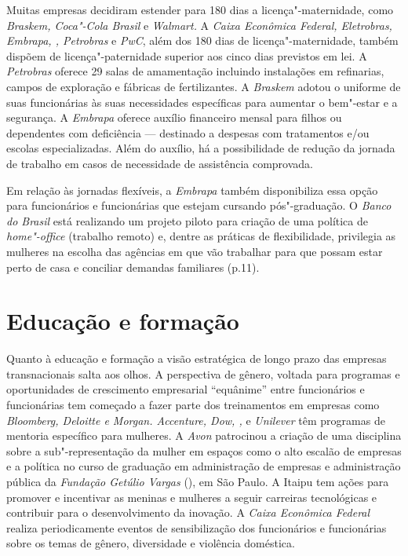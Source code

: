Muitas empresas decidiram estender para 180 dias a licença"-maternidade,
como \emph{Braskem, Coca"-Cola Brasil} e \emph{Walmart.} A \emph{Caixa
Econômica Federal, Eletrobras, Embrapa, , Petrobras} e \emph{PwC},
além dos 180 dias de licença"-maternidade, também dispõem de
licença"-paternidade superior aos cinco dias previstos em lei. A
\emph{Petrobras} oferece 29 salas de amamentação incluindo instalações
em refinarias, campos de exploração e fábricas de fertilizantes. A
\emph{Braskem} adotou o uniforme de suas funcionárias às suas
necessidades específicas para aumentar o bem"-estar e a segurança. A
\emph{Embrapa} oferece auxílio financeiro mensal para filhos ou
dependentes com deficiência --- destinado a despesas com tratamentos e/ou
escolas especializadas. Além do auxílio, há a possibilidade de redução
da jornada de trabalho em casos de necessidade de assistência
comprovada.

Em relação às jornadas flexíveis, a \emph{Embrapa} também disponibiliza
essa opção para funcionários e funcionárias que estejam cursando
pós"-graduação. O \emph{Banco do Brasil} está realizando um projeto
piloto para criação de uma política de \emph{home"-office} (trabalho
remoto) e, dentre as práticas de flexibilidade, privilegia as mulheres
na escolha das agências em que vão trabalhar para que possam estar perto
de casa e conciliar demandas familiares (p.11).

\section{Educação e formação}

Quanto à educação e formação a visão estratégica de longo prazo das
empresas transnacionais salta aos olhos. A perspectiva de gênero,
voltada para programas e oportunidades de crescimento empresarial
``equânime'' entre funcionários e funcionárias tem começado a fazer
parte dos treinamentos em empresas como \emph{Bloomberg, Deloitte e 
Morgan. Accenture, Dow, , } e \emph{Unilever} têm programas de
mentoria específico para mulheres. A \emph{Avon} patrocinou a criação de
uma disciplina sobre a sub"-representação da mulher em espaços como o
alto escalão de empresas e a política no curso de graduação em
administração de empresas e administração pública da \emph{Fundação
Getúlio Vargas} (), em São Paulo. A Itaipu tem ações para promover e
incentivar as meninas e mulheres a seguir carreiras tecnológicas e
contribuir para o desenvolvimento da inovação. A \emph{Caixa Econômica
Federal} realiza periodicamente eventos de sensibilização dos
funcionários e funcionárias sobre os temas de gênero, diversidade e
violência doméstica.


